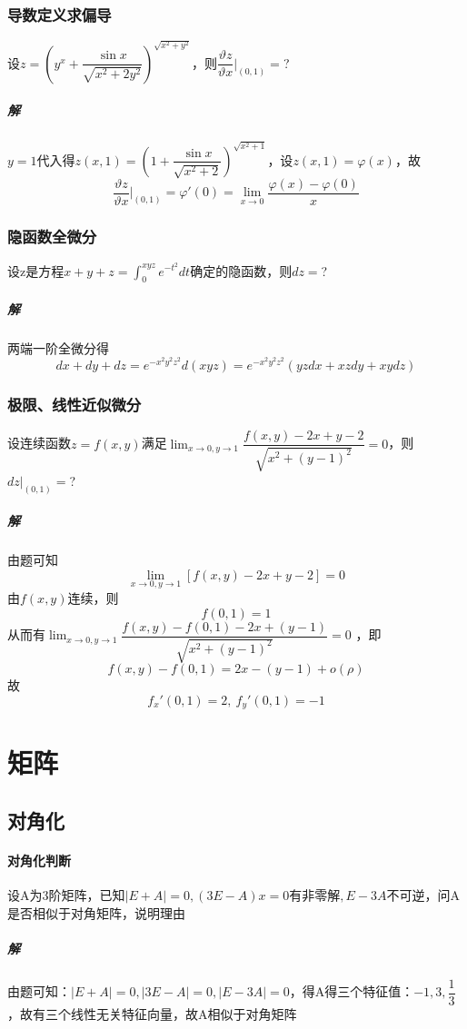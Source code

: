 \subsubsection{导数定义求偏导}
设\(z = (y^x + \dfrac{\sin x}{\sqrt{x^2 + 2y^2}})^{\sqrt{x^2 + y^2}}\)，则\(\dfrac{\vartheta z}{\vartheta x}\bigg|_{(0, 1)} = \)?
\subparagraph{解}
\(y = 1\)代入得\(z(x, 1) = (1 + \dfrac{\sin x}{\sqrt{x^2 + 2}})^{\sqrt{x^2 + 1}}\)，设\(z(x, 1) = \varphi(x)\)，故\[\dfrac{\vartheta z}{\vartheta x}\bigg|_{(0, 1)} = \varphi'(0) = \lim_{x \to 0}\dfrac{\varphi(x) - \varphi(0)}{x}\]


\subsubsection{隐函数全微分}
设z是方程\(x + y + z = \displaystyle\int_0^{xyz}e^{-t^2}dt\)确定的隐函数，则\(dz = \)?
\subparagraph{解}
两端一阶全微分得\[dx + dy + dz = e^{-x^2y^2z^2}d(xyz) = e^{-x^2y^2z^2}(yzdx + xzdy + xydz)\]


\subsubsection{极限、线性近似微分}
设连续函数\(z = f(x, y)\)满足\(\displaystyle\lim_{x \to 0, y \to 1}\dfrac{f(x, y) - 2x + y - 2}{\sqrt{x^2 + (y - 1)^2}} = 0\)，则\(dz\bigg|_{(0, 1)} = \)?
\subparagraph{解}
由题可知\[\displaystyle\lim_{x \to 0, y \to 1}[f(x, y) - 2x + y - 2] = 0\]
由\(f(x, y)\)连续，则\[f(0, 1) = 1\]
从而有\(\displaystyle\lim_{x \to 0, y \to 1}\dfrac{f(x, y) - f(0, 1) - 2x + (y - 1)}{\sqrt{x^2 + (y - 1)^2}} = 0\)
，即\[f(x, y) - f(0, 1) = 2x - (y - 1) + o(\rho)\]
故\[f_x'(0, 1) = 2,\ f_y'(0, 1) = -1\]


\section{矩阵}

\subsection{对角化}

\paragraph{对角化判断}
设A为3阶矩阵，已知\(|E + A| = 0, (3E - A)x = 0\text{有非零解}, E - 3A\)不可逆，问A是否相似于对角矩阵，说明理由
\subparagraph{解}
由题可知：\(|E + A| = 0, |3E - A| = 0, |E - 3A| = 0\)，得A得三个特征值：\(-1, 3, \dfrac{1}{3}\)，故有三个线性无关特征向量，故A相似于对角矩阵

